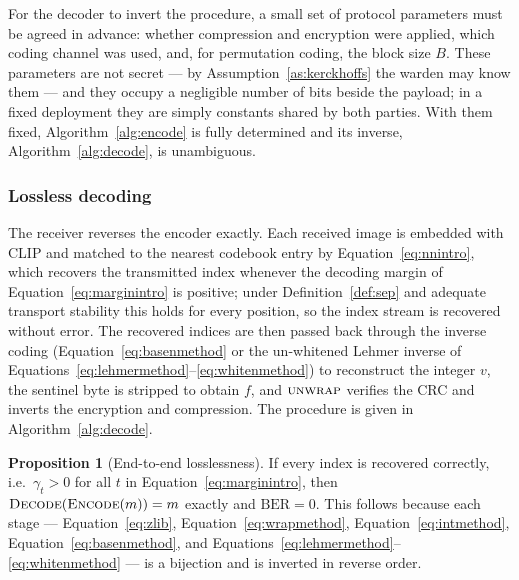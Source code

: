 \documentclass[10pt,a4paper]{article}
\theoremstyle{definition}
\newtheorem{proposition}{Proposition}[section]
\begin{document}
For the decoder to invert the procedure, a small set of protocol parameters must be
agreed in advance: whether compression and encryption were applied, which coding
channel was used, and, for permutation coding, the block size $B$. These parameters
are not secret --- by Assumption~\ref{as:kerckhoffs} the warden may know them --- and
they occupy a negligible number of bits beside the payload; in a fixed deployment
they are simply constants shared by both parties. With them fixed,
Algorithm~\ref{alg:encode} is fully determined and its inverse,
Algorithm~\ref{alg:decode}, is unambiguous.


\subsubsection{Lossless decoding}\label{sec:decode}
The receiver reverses the encoder exactly. Each received image is embedded with
CLIP and matched to the nearest codebook entry by Equation~\eqref{eq:nnintro}, which recovers
the transmitted index whenever the decoding margin of Equation~\eqref{eq:marginintro} is
positive; under Definition~\ref{def:sep} and adequate transport stability this
holds for every position, so the index stream is recovered without error. The
recovered indices are then passed back through the inverse coding
(Equation~\eqref{eq:basenmethod} or the un-whitened Lehmer inverse of
Equations~\eqref{eq:lehmermethod}--\eqref{eq:whitenmethod}) to reconstruct the integer $v$, the
sentinel byte is stripped to obtain $f$, and $\textsc{unwrap}$ verifies the CRC and
inverts the encryption and compression. The procedure is given in
Algorithm~\ref{alg:decode}.

\begin{proposition}[End-to-end losslessness]\label{prop:lossless}
If every index is recovered correctly, i.e.\ $\gamma_t>0$ for all $t$ in
Equation~\eqref{eq:marginintro}, then $\textsc{Decode}(\textsc{Encode}(m))=m$ exactly and
$\mathrm{BER}=0$. This follows because each stage
--- Equation~\eqref{eq:zlib}, Equation~\eqref{eq:wrapmethod}, Equation~\eqref{eq:intmethod}, Equation~\eqref{eq:basenmethod},
and Equations~\eqref{eq:lehmermethod}--\eqref{eq:whitenmethod} --- is a bijection and is inverted
in reverse order.
\end{proposition}
\end{document}
